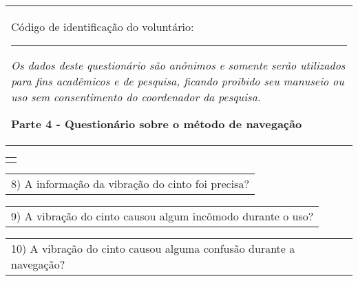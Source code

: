 \FloatBarrier

\begin{table}[!thb]
    \begin{tabular}{m{1\linewidth}}

        {\color{gray}
        
        Código de identificação do voluntário: \rule{1in}{.2mm}
        
        \textit{Os dados deste questionário são anônimos e somente serão utilizados para fins acadêmicos e de pesquisa, ficando proibido seu manuseio ou uso sem consentimento do coordenador da pesquisa.}
        }
        
        \begin{center}
        \textbf{Parte 4 - Questionário sobre o método de navegação}
        \end{center}
        
    \end{tabular}
%
    \begin{tabular}{>{\centering\arraybackslash}m{1\linewidth}}
        {\large TESTE 2 – CINTO HÁPTICO}
    \end{tabular}

    \begin{tabular}{m{1\linewidth}}
        \vspace{2ex}
        8)	A informação da vibração do cinto foi precisa?
    \end{tabular}

        
        

    \begin{tabular}{m{1\linewidth}}
        \vspace{2ex}
        9)	A vibração do cinto causou algum incômodo durante o uso?
    \end{tabular}

        
        

    \begin{tabular}{m{1\linewidth}}
        \vspace{2ex}
        10)	A vibração do cinto causou alguma confusão durante a navegação?
    \end{tabular}


\end{table}
